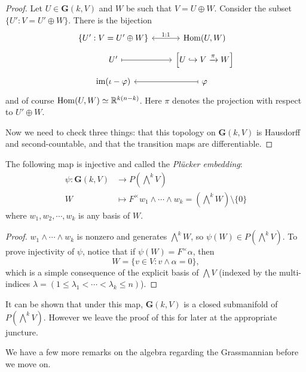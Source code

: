 \begin{proof}
    Let $U\in\mathbf{G}(k,V)$ and $W$ be such that $V=U\oplus W$. Consider the subset $\{U':V=U'\oplus W\}$. There is the bijection
    \[\begin{tikzcd}[row sep=tiny]
        \{U':V=U'\oplus W\} \arrow[r, leftrightarrow, "1:1"] & \operatorname{Hom}(U,W) \\
        U' \arrow[r, mapsto] & \left [U\hookrightarrow V\xrightarrow{\pi}W\right ] \\
        \operatorname{im}(\iota-\varphi) \arrow[r, mapsfrom] & \varphi
    \end{tikzcd}\]
    and of course $\operatorname{Hom}(U,W)\simeq\mathbb{R}^{k(n-k)}$. Here $\pi$ denotes the projection with respect to $U'\oplus W$.

    Now we need to check three things: that this topology on $\mathbf{G}(k,V)$ is Hausdorff and second-countable, and that the transition maps are differentiable.

\end{proof}

\begin{theorem}
    The following map is injective and called the \emph{Plücker embedding}:
    \begin{align*}
        \psi:\mathbf{G}(k,V) &\longrightarrow P(\bigwedge^kV) \\
        W &\longmapsto F^\times w_1\wedge\cdots\wedge w_k=(\bigwedge^kW)\setminus\{0\}
    \end{align*}
    where $w_1,w_2,\cdots,w_k$ is any basis of $W$.
\end{theorem}

\begin{proof}
    $w_1\wedge\cdots\wedge w_k$ is nonzero and generates $\bigwedge^kW$, so $\psi(W)\in P(\bigwedge^kV)$. To prove injectivity of $\psi$, notice that if $\psi(W)=F^\times\alpha$, then
    $$W=\{v\in V:v\wedge\alpha=0\},$$
    which is a simple consequence of the explicit basis of $\bigwedge V$ (indexed by the multi-indices $\lambda=(1\leq\lambda_1<\cdots<\lambda_k\leq n)$).
\end{proof}

It can be shown that under this map, $\mathbf{G}(k,V)$ is a closed submanifold of $P(\bigwedge^kV)$. However we leave the proof of this for later at the appropriate juncture.

We have a few more remarks on the algebra regarding the Grassmannian before we move on. %

